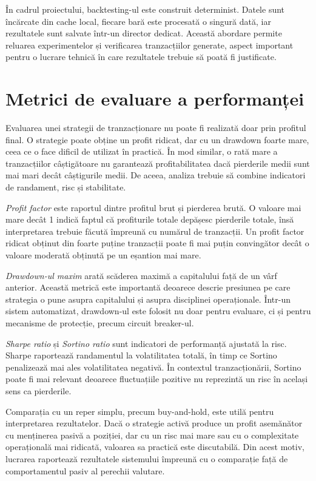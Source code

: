 În cadrul proiectului, backtesting-ul este construit determinist. Datele sunt încărcate din cache local, fiecare bară este procesată o singură dată, iar rezultatele sunt salvate într-un director dedicat. Această abordare permite reluarea experimentelor și verificarea tranzacțiilor generate, aspect important pentru o lucrare tehnică în care rezultatele trebuie să poată fi justificate.

\section{Metrici de evaluare a performanței}
\label{cap:cap2:metrici_performanta}

Evaluarea unei strategii de tranzacționare nu poate fi realizată doar prin profitul final. O strategie poate obține un profit ridicat, dar cu un drawdown foarte mare, ceea ce o face dificil de utilizat în practică. În mod similar, o rată mare a tranzacțiilor câștigătoare nu garantează profitabilitatea dacă pierderile medii sunt mai mari decât câștigurile medii. De aceea, analiza trebuie să combine indicatori de randament, risc și stabilitate.

\textit{Profit factor} este raportul dintre profitul brut și pierderea brută. O valoare mai mare decât 1 indică faptul că profiturile totale depășesc pierderile totale, însă interpretarea trebuie făcută împreună cu numărul de tranzacții. Un profit factor ridicat obținut din foarte puține tranzacții poate fi mai puțin convingător decât o valoare moderată obținută pe un eșantion mai mare.

\textit{Drawdown-ul maxim} arată scăderea maximă a capitalului față de un vârf anterior. Această metrică este importantă deoarece descrie presiunea pe care strategia o pune asupra capitalului și asupra disciplinei operaționale. Într-un sistem automatizat, drawdown-ul este folosit nu doar pentru evaluare, ci și pentru mecanisme de protecție, precum circuit breaker-ul.

\textit{Sharpe ratio} și \textit{Sortino ratio} sunt indicatori de performanță ajustată la risc. Sharpe raportează randamentul la volatilitatea totală, în timp ce Sortino penalizează mai ales volatilitatea negativă. În contextul tranzacționării, Sortino poate fi mai relevant deoarece fluctuațiile pozitive nu reprezintă un risc în același sens ca pierderile.

Comparația cu un reper simplu, precum buy-and-hold, este utilă pentru interpretarea rezultatelor. Dacă o strategie activă produce un profit asemănător cu menținerea pasivă a poziției, dar cu un risc mai mare sau cu o complexitate operațională mai ridicată, valoarea sa practică este discutabilă. Din acest motiv, lucrarea raportează rezultatele sistemului împreună cu o comparație față de comportamentul pasiv al perechii valutare.

